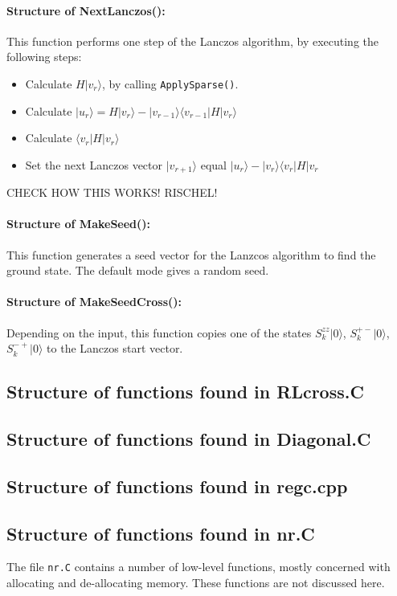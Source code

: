 \documentclass{article}
\begin{document}
\paragraph{Structure of NextLanczos():} This function performs one step of the Lanczos algorithm, by executing the following steps:
\begin{itemize}
\item Calculate $H|v_r\rangle$, by calling \verb+ApplySparse()+.
\item Calculate $|u_r\rangle = H|v_r\rangle - |v_{r-1}\rangle\langle v_{r-1} | H | v_r \rangle$
\item Calculate $\langle v_r | H | v_r \rangle$
\item Set the next Lanczos vector $|v_{r+1} \rangle$ equal $|u_r \rangle - |v_r\rangle \langle v_r | H | v_r$
\end{itemize}
CHECK HOW THIS WORKS! RISCHEL!

\paragraph{Structure of MakeSeed():} This function generates a seed vector for the Lanzcos algorithm to find the ground
state. The default mode gives a random seed.

\paragraph{Structure of MakeSeedCross():} Depending on the input, this function copies one of the states 
$S^{zz}_k |0 \rangle$, $S^{+-}_k |0 \rangle$, $S^{-+}_k |0 \rangle$ to the Lanczos start vector.

\subsection{Structure of functions found in RLcross.C}
\subsection{Structure of functions found in Diagonal.C}
\subsection{Structure of functions found in regc.cpp}
\subsection{Structure of functions found in nr.C}
The file \verb+nr.C+ contains a number of low-level functions, mostly concerned with allocating and de-allocating memory.
These functions are not discussed here.
\end{document}

